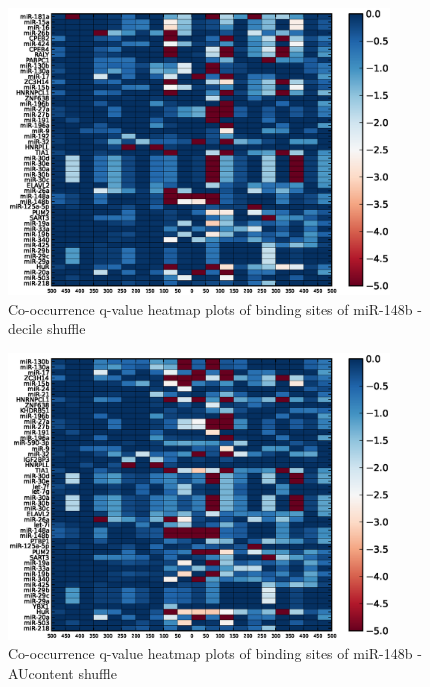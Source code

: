 \begin{figure}
   	\includegraphics[width=0.9\textwidth,clip]{appendix1/figures/miR-148b_decile_expressed_heatmap_qvalues0.eps}
   	\caption{Co-occurrence q-value heatmap plots of binding sites of miR-148b - decile shuffle}
\end{figure}
\clearpage
\begin{figure}
   	\includegraphics[width=0.9\textwidth,clip]{appendix1/figures/miR-148b_AUcontent_expressed_heatmap_qvalues0.eps}
   	\caption{Co-occurrence q-value heatmap plots of binding sites of miR-148b - AUcontent shuffle}
\end{figure}

